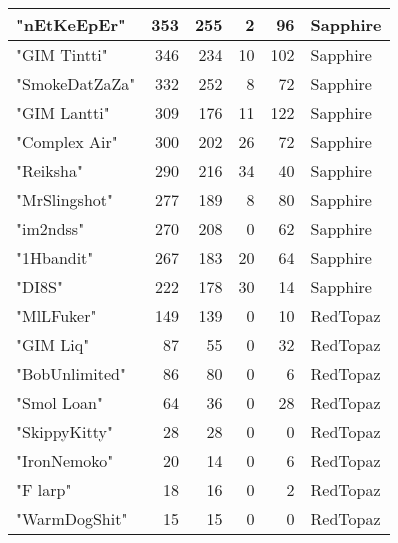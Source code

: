 \documentclass{article}
\begin{document}
\begin{table}[htbp]
\begin{tabular}{|l|r|r|r|r|l|}
"nEtKeEpEr" & 353 & 255 & 2 & 96 & Sapphire \\ \hline
"GIM Tintti" & 346 & 234 & 10 & 102 & Sapphire \\ \hline
"SmokeDatZaZa" & 332 & 252 & 8 & 72 & Sapphire \\ \hline
"GIM Lantti" & 309 & 176 & 11 & 122 & Sapphire \\ \hline
"Complex Air" & 300 & 202 & 26 & 72 & Sapphire \\ \hline
"Reiksha" & 290 & 216 & 34 & 40 & Sapphire \\ \hline
"MrSlingshot" & 277 & 189 & 8 & 80 & Sapphire \\ \hline
"im2ndss" & 270 & 208 & 0 & 62 & Sapphire \\ \hline
"1Hbandit" & 267 & 183 & 20 & 64 & Sapphire \\ \hline
"DI8S" & 222 & 178 & 30 & 14 & Sapphire \\ \hline
"MlLFuker" & 149 & 139 & 0 & 10 & RedTopaz \\ \hline
"GIM Liq" & 87 & 55 & 0 & 32 & RedTopaz \\ \hline
"BobUnlimited" & 86 & 80 & 0 & 6 & RedTopaz \\ \hline
"Smol Loan" & 64 & 36 & 0 & 28 & RedTopaz \\ \hline
"SkippyKitty" & 28 & 28 & 0 & 0 & RedTopaz \\ \hline
"IronNemoko" & 20 & 14 & 0 & 6 & RedTopaz \\ \hline
"F larp" & 18 & 16 & 0 & 2 & RedTopaz \\ \hline
"WarmDogShit" & 15 & 15 & 0 & 0 & RedTopaz \\ \hline
\end{tabular}
\end{table}
\end{document}
